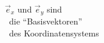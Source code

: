 \documentclass[preview]{standalone}
\begin{document}
\begin{center}
$\vec{e}_x$ und $\vec{e}_y$ sind\\\ die ``Basisvektoren'' \\\ des Koordinatensystems
\end{center}
\end{document}
